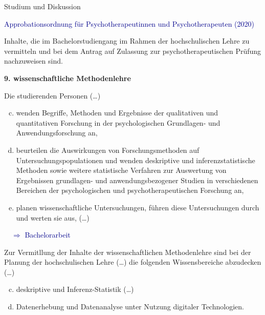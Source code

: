 \documentclass[
  8pt,
  ignorenonframetext,
]{beamer}
\begin{document}
\begin{frame}{Studium und Diskussion}
\protect\hypertarget{studium-und-diskussion-5}{}

\textcolor{darkblue}{Approbationsordnung für Psychotherapeutinnen und Psychotherapeuten (2020)}
\footnotesize \vspace{2mm}

Inhalte, die im Bachelorstudiengang im Rahmen der hochschulischen Lehre
zu vermitteln und bei dem Antrag auf Zulassung zur psychotherapeutischen
Prüfung nachzuweisen sind.

\noindent \textbf{9. wissenschaftliche Methodenlehre}

Die studierenden Personen (\ldots)

\begin{enumerate}
[a)]
\setcounter{enumi}{2}
\item
  wenden Begriffe, Methoden und Ergebnisse der qualitativen und
  quantitativen Forschung in der psychologischen Grundlagen- und
  Anwendungsforschung an,
\item
  beurteilen die Auswirkungen von Forschungsmethoden auf
  Untersuchungspopulationen und wenden deskriptive und
  inferenzstatistische Methoden sowie weitere statistische Verfahren zur
  Auswertung von Ergebnissen grundlagen- und anwendungsbezogener Studien
  in verschiedenen Bereichen der psychologischen und
  psychotherapeutischen Forschung an,
\item
  planen wissenschaftliche Untersuchungen, führen diese Untersuchungen
  durch und werten sie aus, (\ldots)
\end{enumerate}

\textcolor{darkblue}{$\quad\Rightarrow$ Bachelorarbeit}

Zur Vermitllung der Inhalte der wissenschaftlichen Methodenlehre sind
bei der Planung der hochschulischen Lehre (\ldots) die folgenden
Wissensbereiche abzudecken (\ldots)

\begin{enumerate}
[a)]
\setcounter{enumi}{2}
\item
  deskriptive und Inferenz-Statistik (\ldots)
\item
  Datenerhebung und Datenanalyse unter Nutzung digitaler Technologien.
\end{enumerate}
\end{frame}
\end{document}
